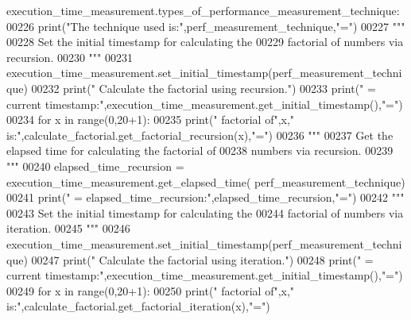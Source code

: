 \begin{DoxyCode}
      execution\_time\_measurement.types\_of\_performance\_measurement\_technique:
00226                 print(\textcolor{stringliteral}{"The technique used is:"},perf\_measurement\_technique,\textcolor{stringliteral}{"="})
00227                 \textcolor{stringliteral}{"""}
00228 \textcolor{stringliteral}{                    Set the initial timestamp for calculating the}
00229 \textcolor{stringliteral}{                        factorial of numbers via recursion.}
00230 \textcolor{stringliteral}{                """}
00231                 execution\_time\_measurement.set\_initial\_timestamp(perf\_measurement\_technique)
00232                 print(\textcolor{stringliteral}{" Calculate the factorial using recursion."})
00233                 print(\textcolor{stringliteral}{" = current timestamp:"},execution\_time\_measurement.get\_initial\_timestamp(),\textcolor{stringliteral}{"="})
00234                 \textcolor{keywordflow}{for} x \textcolor{keywordflow}{in} range(0,20+1):
00235                     print(\textcolor{stringliteral}{"     factorial of"},x,\textcolor{stringliteral}{" is:"},calculate\_factorial.get\_factorial\_recursion(x),\textcolor{stringliteral}{"="})
00236                 \textcolor{stringliteral}{"""}
00237 \textcolor{stringliteral}{                    Get the elapsed time for calculating the factorial of}
00238 \textcolor{stringliteral}{                        numbers via recursion.}
00239 \textcolor{stringliteral}{                """}
00240                 elapsed\_time\_recursion = execution\_time\_measurement.get\_elapsed\_time(
      perf\_measurement\_technique)
00241                 print(\textcolor{stringliteral}{" = elapsed\_time\_recursion:"},elapsed\_time\_recursion,\textcolor{stringliteral}{"="})
00242                 \textcolor{stringliteral}{"""}
00243 \textcolor{stringliteral}{                    Set the initial timestamp for calculating the}
00244 \textcolor{stringliteral}{                        factorial of numbers via iteration.}
00245 \textcolor{stringliteral}{                """}
00246                 execution\_time\_measurement.set\_initial\_timestamp(perf\_measurement\_technique)
00247                 print(\textcolor{stringliteral}{" Calculate the factorial using iteration."})
00248                 print(\textcolor{stringliteral}{" = current timestamp:"},execution\_time\_measurement.get\_initial\_timestamp(),\textcolor{stringliteral}{"="})
00249                 \textcolor{keywordflow}{for} x \textcolor{keywordflow}{in} range(0,20+1):
00250                     print(\textcolor{stringliteral}{"     factorial of"},x,\textcolor{stringliteral}{" is:"},calculate\_factorial.get\_factorial\_iteration(x),\textcolor{stringliteral}{"="})

\end{DoxyCode}
